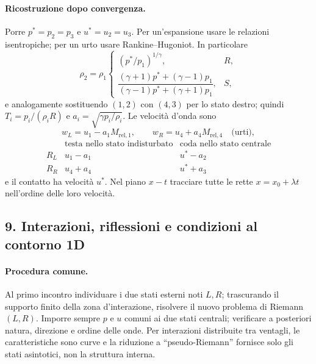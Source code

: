 \documentclass[11pt,a4paper]{article}
\begin{document}
\paragraph*{Ricostruzione dopo convergenza.}
Porre $p^*=p_2=p_3$ e $u^*=u_2=u_3$. Per un'espansione usare le relazioni
isentropiche; per un urto usare Rankine--Hugoniot. In particolare
\[
\rho_2=\rho_1
\begin{cases}(p^*/p_1)^{1/\gamma},&R,\\
\dfrac{(\gamma+1)p^*+(\gamma-1)p_1}{(\gamma-1)p^*+(\gamma+1)p_1},&S,
\end{cases}
\]
e analogamente sostituendo $(1,2)$ con $(4,3)$ per lo stato destro; quindi
$T_i=p_i/(\rho_iR)$ e $a_i=\sqrt{\gamma p_i/\rho_i}$.
Le velocità d'onda sono
\[
w_L=u_1-a_1M_{\mathrm{rel},1},\qquad
w_R=u_4+a_4M_{\mathrm{rel},4}\quad\text{(urti)},
\]
\[
\begin{array}{c|cc}
&\text{testa nello stato indisturbato}&\text{coda nello stato centrale}\\ \hline
R_L&u_1-a_1&u^*-a_2\\
R_R&u_4+a_4&u^*+a_3
\end{array}
\]
e il contatto ha velocità $u^*$. Nel piano $x-t$ tracciare tutte le rette
$x=x_0+\lambda t$ nell'ordine delle loro velocità.

\subsection*{9. Interazioni, riflessioni e condizioni al contorno 1D}

\paragraph*{Procedura comune.}
Al primo incontro individuare i due stati esterni noti $L,R$; trascurando il supporto
finito della zona d'interazione, risolvere il nuovo problema di Riemann $(L,R)$.
Imporre sempre $p$ e $u$ comuni ai due stati centrali; verificare a posteriori natura,
direzione e ordine delle onde. Per interazioni distribuite tra ventagli, le
caratteristiche sono curve e la riduzione a ``pseudo-Riemann'' fornisce solo gli stati
asintotici, non la struttura interna.
\end{document}
